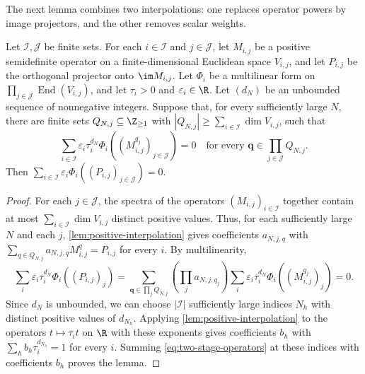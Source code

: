 The next lemma combines two interpolations: one replaces operator powers
by image projectors, and the other removes scalar weights.
\begin{lemma}\label{lem:two-stage-interpolation}
 Let $\mathcal I,\mathcal J$ be finite sets. For each $i\in\mathcal I$ and $j\in\mathcal J$, let
 $M_{i,j}$ be a positive semidefinite operator on a finite-dimensional
 Euclidean space $V_{i,j}$, and let $P_{i,j}$ be the orthogonal projector
 onto $\im M_{i,j}$. Let $\Phi_i$ be a multilinear form on
 $\prod_{j\in\mathcal J}\operatorname{End}(V_{i,j})$, and let
 $\tau_i>0$ and $\varepsilon_i\in\R$.
 Let $(d_N)$ be an unbounded sequence of nonnegative integers.
 Suppose that, for every sufficiently large $N$, there are finite
 sets $Q_{N,j}\subseteq\Z_{\geq1}$ with
 $|Q_{N,j}|\geq\sum_{i\in\mathcal I}\dim V_{i,j}$,
 such that
 \begin{equation}\label{eq:two-stage-samples}
  \sum_{i\in\mathcal I}\varepsilon_i\tau_i^{d_N}
     \Phi_i((M_{i,j}^{q_j})_{j\in\mathcal J})=0
  \quad\text{for every }\mathbf q\in\prod_{j\in\mathcal J}Q_{N,j}.
 \end{equation}
 Then $\sum_{i\in\mathcal I}\varepsilon_i\Phi_i((P_{i,j})_{j\in\mathcal J})=0$.
\end{lemma}
\begin{proof}
 For each $j\in\mathcal J$, the spectra of the operators $(M_{i,j})_{i\in\mathcal I}$
 together contain at most $\sum_{i\in\mathcal I}\dim V_{i,j}$ distinct positive
 values. Thus, for each sufficiently large $N$ and each $j$,
 \cref{lem:positive-interpolation} gives coefficients $a_{N,j,q}$ with
 $\sum_{q\in Q_{N,j}}a_{N,j,q}M_{i,j}^q=P_{i,j}$ for every $i$.
 By multilinearity,
 \begin{equation}\label{eq:two-stage-operators}
  \sum_i\varepsilon_i\tau_i^{d_N}\Phi_i((P_{i,j})_j)
  =\sum_{\mathbf q\in\prod_jQ_{N,j}}
      \left(\prod_ja_{N,j,q_j}\right)
      \sum_i\varepsilon_i\tau_i^{d_N}\Phi_i((M_{i,j}^{q_j})_j)=0.
 \end{equation}
 Since $d_N$ is unbounded, we can choose $|\mathcal I|$ sufficiently large indices $N_h$
 with distinct positive values of $d_{N_h}$.
 Applying \cref{lem:positive-interpolation} to the operators
 $t\mapsto\tau_i t$ on $\R$ with these exponents gives coefficients $b_h$
 with $\sum_hb_h\tau_i^{d_{N_h}}=1$ for every $i$.
 Summing \cref{eq:two-stage-operators} at these indices with
 coefficients $b_h$ proves the lemma.
\end{proof}

